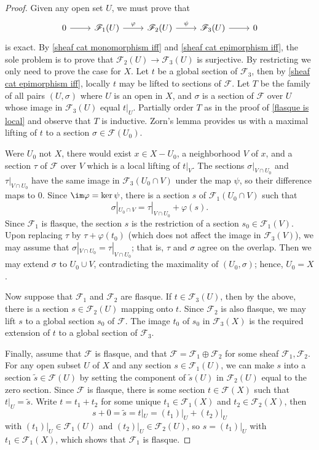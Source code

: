 \begin{proof}
Given any open set $U$, we must prove that
\[\begin{tikzcd}
0\ar[r]&\mathscr{F}_1(U)\ar[r,"\varphi"]&\mathscr{F}_2(U)\ar[r,"\psi"]&\mathscr{F}_3(U)\ar[r]&0
\end{tikzcd}\]
is exact. By \cref{sheaf cat monomorphism iff} and \cref{sheaf cat epimorphism iff}, the sole problem is to prove that $\mathscr{F}_2(U)\to\mathscr{F}_3(U)$ is surjective. By restricting we only need to prove the case for $X$. Let $t$ be a global section of $\mathscr{F}_3$, then by \cref{sheaf cat epimorphism iff}, locally $t$ may be lifted to sections of $\mathscr{F}$. Let $T$ be the family of all pairs $(U,\sigma)$ where $U$ is an open in $X$, and $\sigma$ is a section of $\mathscr{F}$ over $U$ whose image in $\mathscr{F}_3(U)$ equal $t|_{U}$. Partially order $T$ as in the proof of \cref{flasque is local} and observe that $T$ is inductive. Zorn's lemma provides us with a maximal lifting of $t$ to a section $\sigma\in\mathscr{F}(U_0)$.\par
Were $U_0$ not $X$, there would exist $x\in X-U_0$, a neighborhood $V$ of $x$, and a section $\tau$ of $\mathscr{F}$ over $V$ which is a local lifting of $t|_V$. The sections $\sigma|_{V\cap U_0}$ and $\tau|_{V\cap U_0}$ have the same image in $\mathscr{F}_3(U_0\cap V)$ under the map $\psi$, so their difference maps to $0$. Since $\im\varphi=\ker\psi$, there is a section $s$ of $\mathscr{F}_1(U_0\cap V)$ such that
\[\sigma|_{U_0\cap V}=\tau|_{V\cap U_0}+\varphi(s).\]
Since $\mathscr{F}_1$ is flasque, the section $s$ is the restriction of a section $s_0\in\mathscr{F}_1(V)$. Upon replacing $\tau$ by $\tau+\varphi(t_0)$ (which does not affect the image in $\mathscr{F}_3(V)$), we may assume that $\sigma|_{V\cap U_0}=\tau|_{V\cap U_0}$; that is, $\tau$ and $\sigma$ agree on the overlap. Then we may extend $\sigma$ to $U_0\cup V$, contradicting the maximality of $(U_0,\sigma)$; hence, $U_0=X$.\par
Now suppose that $\mathscr{F}_1$ and $\mathscr{F}_2$ are flasque. If $t\in\mathscr{F}_3(U)$, then by the above, there is a section $s\in\mathscr{F}_2(U)$ mapping onto $t$. Since $\mathscr{F}_2$ is also flasque, we may lift $s$ to a global section $s_0$ of $\mathscr{F}$. The image $t_0$ of $s_0$ in $\mathscr{F}_3(X)$ is the required extension of $t$ to a global section of $\mathscr{F}_3$.\par
Finally, assume that $\mathscr{F}$ is flasque, and that $\mathscr{F}=\mathscr{F}_1\oplus\mathscr{F}_2$ for some sheaf $\mathscr{F}_1,\mathscr{F}_2$. For any open subset $U$ of $X$ and any section $s\in\mathscr{F}_1(U)$, we can make $s$ into a section $\tilde{s}\in\mathscr{F}(U)$ by setting the component of $\tilde{s}(U)$ in $\mathscr{F}_2(U)$ equal to the zero section. Since $\mathscr{F}$ is flasque, there is some section $t\in\mathscr{F}(X)$ such that $t|_U=\tilde{s}$. Write $t=t_1+t_2$ for some unique $t_1\in\mathscr{F}_1(X)$ and $t_2\in\mathscr{F}_2(X)$, then
\[s+0=\tilde{s}=t|_U=(t_1)|_U+(t_2)|_U\]
with $(t_1)|_U\in\mathscr{F}_1(U)$ and $(t_2)|_U\in\mathscr{F}_2(U)$, so $s=(t_1)|_U$ with $t_1\in\mathscr{F}_1(X)$, which shows that $\mathscr{F}_1$ is flasque.
\end{proof}
